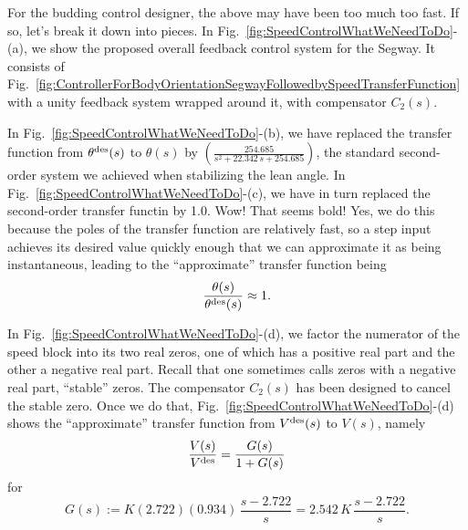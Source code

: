 For the budding control designer, the above may have been too much too fast. If so, let's break it down into pieces. In Fig.~\ref{fig:SpeedControlWhatWeNeedToDo}-(a), we show the proposed overall feedback control system for the Segway. It consists of Fig.~\ref{fig:ControllerForBodyOrientationSegwayFollowedbySpeedTransferFunction} with a unity feedback system wrapped around it, with compensator $C_2(s)$.



In Fig.~\ref{fig:SpeedControlWhatWeNeedToDo}-(b), we have replaced the transfer function from $\theta^{\rm des}(s)$ to $\theta(s)$ by $\left(\frac{254.685}{s^2 + 22.342\,s + 254.685}\right)$, the standard second-order system we achieved when stabilizing the lean angle. In Fig.~\ref{fig:SpeedControlWhatWeNeedToDo}-(c), we have in turn replaced the second-order transfer functin by 1.0. Wow! That seems bold! Yes, we do this because the poles of the transfer function are relatively fast, so a step input achieves its desired value quickly enough that we can approximate it as being instantaneous, leading to the ``approximate'' transfer function being 
$$ \frac{\theta(s)}{\theta^{\rm des}(s)} \approx 1.$$



In Fig.~\ref{fig:SpeedControlWhatWeNeedToDo}-(d), we factor the numerator of the speed block into its two real zeros, one of which has a positive real part and the other a negative real part. Recall that one sometimes calls zeros with a negative real part, ``stable'' zeros. The compensator $C_2(s)$ has been designed to cancel the stable zero. Once we do that, Fig.~\ref{fig:SpeedControlWhatWeNeedToDo}-(d) shows the ``approximate'' transfer function from $V^{\rm des}(s)$ to $V(s)$, namely
\begin{equation}
    \label{eq:SimplifiedSpeedLoopA}
    \frac{V(s)}{V^{\rm des}} = \frac{G(s)}{1+G(s)}
\end{equation}
for
\begin{equation}
    \label{eq:SimplifiedSpeedLoopB}
    G(s):= K (2.722)(0.934) \,\frac{s-2.722}{s} = 2.542 \, K  \,\frac{s-2.722}{s}.
\end{equation}

\FloatBarrier


